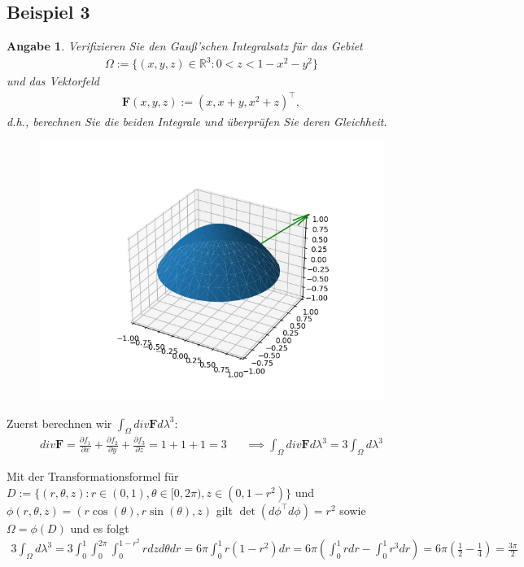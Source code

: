 \documentclass[]{article}
\newtheorem*{angabe*}{Angabe}
\begin{document}
\subsection*{Beispiel 3}
\begin{angabe*}
	Verifizieren Sie den Gauß'schen Integralsatz für das Gebiet
	\begin{align*}
		\Omega := \{(x,y,z) \in \mathbb{R}^3: 0<z<1-x^2-y^2\}
	\end{align*}
	und das Vektorfeld
	\begin{align*}
		\bm{F}(x,y,z) := (x, x+y, x^2+z)^\top,
	\end{align*}
	d.h., berechnen Sie die beiden Integrale und überprüfen Sie deren Gleichheit.
\end{angabe*}

\begin{figure}[h!]
	\includegraphics[width=0.5\columnwidth]{bsp_3.png}
\end{figure}

Zuerst berechnen wir $\int_\Omega div\bm{F} d\lambda^3$:
\begin{align*}
	div\bm{F} = \frac{\partial f_1}{\partial x} + \frac{\partial f_2}{\partial y} + \frac{\partial f_3}{\partial z} = 1 + 1 + 1 = 3 && \implies	\int_\Omega div\bm{F} d\lambda^3 = 3 \int_\Omega d\lambda^3
\end{align*}

Mit der Transformationsformel für $D:=\{(r,\theta, z): r \in (0,1), \theta \in [0,2\pi), z \in (0,1-r^2)\}$ und $\phi(r,\theta, z) = (r\cos(\theta), r\sin(\theta), z)$ gilt $\det(d\phi^\top d\phi) = r^2$ sowie $\Omega=\phi(D)$ und es folgt
\begin{align*}
	3 \int_\Omega d\lambda^3 = 3 \int_{0}^{1} \int_{0}^{2\pi} \int_{0}^{1-r^2} r dz d\theta dr = 6\pi \int_{0}^{1} r(1-r^2) dr = 6\pi \left(\int_{0}^{1} r dr - \int_{0}^{1} r^3 dr\right) = 6\pi (\frac{1}{2}-\frac{1}{4}) = \frac{3\pi}{2}
\end{align*}
\end{document}
